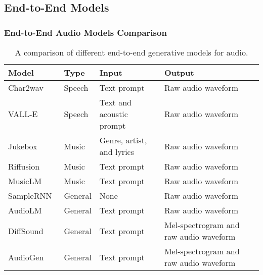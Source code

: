 \subsection{End-to-End Models}


\begin{frame}[allowframebreaks]
    \frametitle{End-to-End Audio Models Comparison}

    \begin{table}[ht]
        \centering
        \caption{A comparison of different end-to-end generative models for audio.}
        \begin{tabularx}{\textwidth}{|X|l|X|X|}
            \hline
            \textbf{Model}                           & \textbf{Type} & \textbf{Input}            & \textbf{Output}                        \\ \hline
            Char2wav~\cite{sotelo_char2wav_2017}     & Speech        & Text prompt               & Raw audio waveform                     \\ \hline
            VALL-E~\cite{wang_neural_2023}           & Speech        & Text and acoustic prompt  & Raw audio waveform                     \\ \hline
            Jukebox~\cite{dhariwal_jukebox_2020}     & Music         & Genre, artist, and lyrics & Raw audio waveform                     \\ \hline
            Riffusion~\cite{forsgren_riffusion_2022} & Music         & Text prompt               & Raw audio waveform                     \\ \hline
            MusicLM~\cite{agostinelli_musiclm_2023}  & Music         & Text prompt               & Raw audio waveform                     \\ \hline
            SampleRNN~\cite{mehri_samplernn_2017}    & General       & None                      & Raw audio waveform                     \\ \hline
            AudioLM~\cite{borsos_audiolm_2022}       & General       & Text prompt               & Raw audio waveform                     \\ \hline
            DiffSound~\cite{yang_diffsound_2022}     & General       & Text prompt               & Mel-spectrogram and raw audio waveform \\ \hline
            AudioGen~\cite{kreuk_audiogen_2023}      & General       & Text prompt               & Mel-spectrogram and raw audio waveform \\ \hline
        \end{tabularx}
        \label{tab:end-to-end-audio-models}
    \end{table}
\end{frame}

